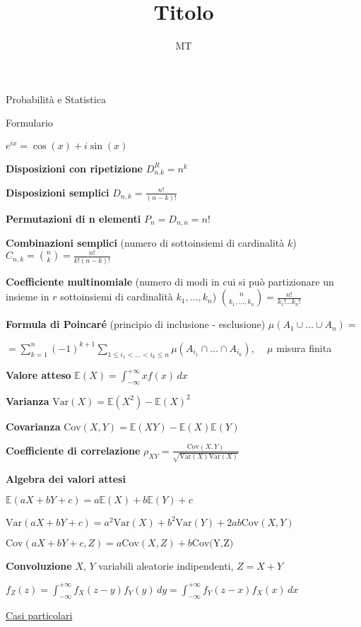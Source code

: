 \documentclass[openany]{book} %
\title{Titolo}
\date{}
\author{MT}
\begin{document}
\begin{center}
\Large Probabilità e Statistica 

\large Formulario
\end{center}

$e^{ix} = \cos(x)+i\sin(x)$

\textbf{Disposizioni con ripetizione} $D^R_{n.k}=n^k$

\textbf{Disposizioni semplici} $D_{n,k}=\frac{n!}{(n-k)!}$

\textbf{Permutazioni di n elementi} \quad $P_n = D_{n,n}=n!$

\textbf{Combinazioni semplici} (numero di sottoinsiemi di cardinalità $k$) \quad $C_{n,k}=\binom {n}{k} = \frac{n!}{k!(n-k)!}$

\textbf{Coefficiente multinomiale} (numero di modi in cui si può partizionare un insieme in $r$ sottoinsiemi di cardinalità $k_1,\dots,k_n$) \quad $\binom {n}{k_1,\dots,k_n}=\frac{n!}{k_1 ! \dots k_n !}$ 

\textbf{Formula di Poincaré} (principio di inclusione - esclusione) \quad $\mu(A_1 \cup \dots \cup A_n) =$ 

$= \sum_{k=1}^n (-1)^{k+1}\sum_{1\leq i_1 < \dots <i_k \leq n}\mu(A_{i_1}\cap \dots \cap A_{i_k})$, $\quad \mu$ misura finita

\textbf{Valore atteso} $\mathbb{E}(X) = \int_{-\infty}^{+\infty}xf(x)\,dx$

\textbf{Varianza} $\text{Var}(X)=\mathbb{E}(X^2)-\mathbb{E}(X)^2$

\textbf{Covarianza} $\text{Cov}(X,Y)=\mathbb{E}(XY)-\mathbb{E}(X)\mathbb{E}(Y)$

\textbf{Coefficiente di correlazione} $\rho_{XY} = \frac{\text{Cov}(X,Y)}{\sqrt {\text{Var}(X)\text{Var}(X)}}$

\textbf{Algebra dei valori attesi}

$\mathbb {E}(aX+bY+c)= a\mathbb{E}(X)+b \mathbb{E}(Y)+c$

$\text {Var}(aX+bY+c)= a^2 \text{Var}(X)+b^2 \text{Var}(Y)+2ab\text{Cov}(X,Y)$

$\text{Cov}(aX+bY+c,Z) = a \text{Cov}(X,Z)+b \text{Cov(Y,Z)}$

\textbf{Convoluzione} $X,\,Y$ variabili aleatorie indipendenti, $Z=X+Y$

$f_Z(z) = \int_{-\infty}^{+\infty}f_X(z-y)f_Y(y)\,dy = \int_{-\infty}^{+\infty}f_Y(z-x)f_X(x)\,dx$

\underline{Casi particolari}
\end{document}
